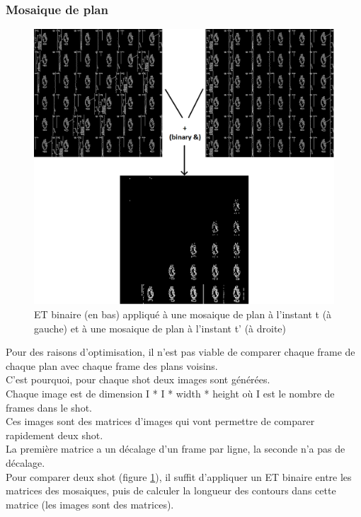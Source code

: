 \documentclass[11pt]{article}
\begin{document}
\subsubsection{Mosaique de plan}
\label{sec:orgf9334f5}
\begin{figure}[htbp]
\centering
\includegraphics[width=16cm]{mosaique_add.png}
\caption{ET binaire (en bas) appliqué à une mosaique de plan à l'instant t (à gauche) et à une mosaique de plan à l'instant t' (à droite) \label{mosaic}}
\end{figure}
Pour des raisons d'optimisation, il n'est pas viable de comparer chaque frame de chaque plan avec chaque frame des plans voisins.\\

C'est pourquoi, pour chaque shot deux images sont générées.\\

Chaque image est de dimension I * I * width * height où I est le nombre de frames dans le shot.\\

Ces images sont des matrices d'images qui vont permettre de comparer rapidement deux shot.\\
La première matrice a un décalage d'un frame par ligne, la seconde n'a pas de décalage.\\

Pour comparer deux shot (figure \ref{mosaic}), il suffit d’appliquer un ET binaire entre les matrices des mosaiques, puis de calculer la longueur des contours dans cette matrice (les images sont des matrices).\\
\end{document}
